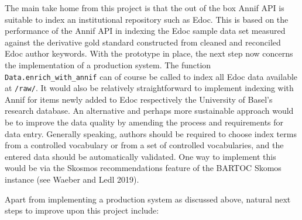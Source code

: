 The main take home from this project is that the out of the box Annif
API is suitable to index an institutional repository such as Edoc. This
is based on the performance of the Annif API in indexing the Edoc sample
data set measured against the derivative gold standard constructed from
cleaned and reconciled Edoc author keywords. With the prototype in
place, the next step now concerns the implementation of a production
system. The function \texttt{Data.enrich\_with\_annif} can of course be
called to index all Edoc data available at \texttt{/raw/}. It would also
be relatively straightforward to implement indexing with Annif for items
newly added to Edoc respectively the University of Basel's research
database. An alternative and perhaps more sustainable approach would be
to improve the data quality by amending the process and requirements for
data entry. Generally speaking, authors should be required to choose
index terms from a controlled vocabulary or from a set of controlled
vocabularies, and the entered data should be automatically validated.
One way to implement this would be via the Skosmos recommendations
feature of the BARTOC Skomos instance (see Waeber and Ledl 2019).

Apart from implementing a production system as discussed above, natural
next steps to improve upon this project include:


